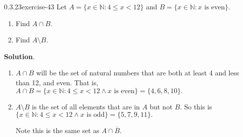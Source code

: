 \documentclass[twoside,11pt,]{book}
\numberwithin{equation}{chapter}
\newcommand{\N}{\mathbb N}
\newcommand{\st}{:}
\newcommand{\lt}{<}
\begin{document}
\begin{divisionsolution}{0.3.23}{}{exercise-43}%
\hypertarget{p-748}{}%
Let \(A = \{x \in \N \st 4 \le x \lt 12\}\) and \(B = \{x \in \N \st x \text{ is even}\}\text{.}\)\leavevmode%
\begin{enumerate}[label=(\alph*)]
\item\hypertarget{li-668}{}\hypertarget{p-749}{}%
Find \(A \cap B\text{.}\)%
\item\hypertarget{li-669}{}\hypertarget{p-751}{}%
Find \(A \setminus B\text{.}\)%
\end{enumerate}
%
\par\smallskip%
\noindent\textbf{Solution}.\quad%
\hypertarget{p-753}{}%
\leavevmode%
\begin{enumerate}[label=(\alph*)]
\item\hypertarget{li-670}{}\hypertarget{p-754}{}%
\(A \cap B\) will be the set of natural numbers that are both at least 4 and less than 12, and even. That is, \(A \cap B = \{x \in \N \st 4\le x \lt 12 \wedge x \text{ is even}\} = \{4, 6, 8, 10\}\text{.}\)%
\item\hypertarget{li-671}{}\hypertarget{p-755}{}%
\(A \setminus B\) is the set of all elements that are in \(A\) but not \(B\text{.}\) So this is \(\{x \in \N \st 4 \le x \lt 12 \wedge x \text{ is odd}\} = \{5,7,9,11\}\text{.}\)%
\par
\hypertarget{p-756}{}%
Note this is the same set as \(A \cap \overline{B}\text{.}\)%
\end{enumerate}
%
\end{divisionsolution}%
\end{document}
